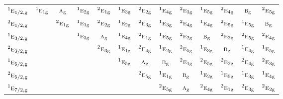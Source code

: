 \documentclass[10pt,a4paper]{article}
\numberwithin{equation}{section}
\newcommand{\irr}[1]{\text{\normalfont\scshape #1}}
\newcommand{\conjpair}[1]{{}^{#1}}
\newcommand{\ptag}[1]{\mathrm{#1}}
\begin{document}
{\begin{longtable}{@{}lcccccccccccc@{}}
$\conjpair{1}\irr{e}_{1/2,\ptag{g}}$ & $\conjpair{1}\irr{e}_{1\ptag{g}}$ & $\irr{a}_{\ptag{g}}$ & $\conjpair{1}\irr{e}_{2\ptag{g}}$ & $\conjpair{2}\irr{e}_{1\ptag{g}}$ & $\conjpair{1}\irr{e}_{3\ptag{g}}$ & $\conjpair{2}\irr{e}_{2\ptag{g}}$ & $\conjpair{1}\irr{e}_{4\ptag{g}}$ & $\conjpair{2}\irr{e}_{3\ptag{g}}$ & $\conjpair{1}\irr{e}_{5\ptag{g}}$ & $\conjpair{2}\irr{e}_{4\ptag{g}}$ & $\irr{b}_{\ptag{g}}$ & $\conjpair{2}\irr{e}_{5\ptag{g}}$\\
$\conjpair{2}\irr{e}_{1/2,\ptag{g}}$ &  & $\conjpair{2}\irr{e}_{1\ptag{g}}$ & $\conjpair{1}\irr{e}_{1\ptag{g}}$ & $\conjpair{2}\irr{e}_{2\ptag{g}}$ & $\conjpair{1}\irr{e}_{2\ptag{g}}$ & $\conjpair{2}\irr{e}_{3\ptag{g}}$ & $\conjpair{1}\irr{e}_{3\ptag{g}}$ & $\conjpair{2}\irr{e}_{4\ptag{g}}$ & $\conjpair{1}\irr{e}_{4\ptag{g}}$ & $\conjpair{2}\irr{e}_{5\ptag{g}}$ & $\conjpair{1}\irr{e}_{5\ptag{g}}$ & $\irr{b}_{\ptag{g}}$\\
$\conjpair{1}\irr{e}_{3/2,\ptag{g}}$ &  &  & $\conjpair{1}\irr{e}_{3\ptag{g}}$ & $\irr{a}_{\ptag{g}}$ & $\conjpair{1}\irr{e}_{4\ptag{g}}$ & $\conjpair{2}\irr{e}_{1\ptag{g}}$ & $\conjpair{1}\irr{e}_{5\ptag{g}}$ & $\conjpair{2}\irr{e}_{2\ptag{g}}$ & $\irr{b}_{\ptag{g}}$ & $\conjpair{2}\irr{e}_{3\ptag{g}}$ & $\conjpair{2}\irr{e}_{5\ptag{g}}$ & $\conjpair{2}\irr{e}_{4\ptag{g}}$\\
$\conjpair{2}\irr{e}_{3/2,\ptag{g}}$ &  &  &  & $\conjpair{2}\irr{e}_{3\ptag{g}}$ & $\conjpair{1}\irr{e}_{1\ptag{g}}$ & $\conjpair{2}\irr{e}_{4\ptag{g}}$ & $\conjpair{1}\irr{e}_{2\ptag{g}}$ & $\conjpair{2}\irr{e}_{5\ptag{g}}$ & $\conjpair{1}\irr{e}_{3\ptag{g}}$ & $\irr{b}_{\ptag{g}}$ & $\conjpair{1}\irr{e}_{4\ptag{g}}$ & $\conjpair{1}\irr{e}_{5\ptag{g}}$\\
$\conjpair{1}\irr{e}_{5/2,\ptag{g}}$ &  &  &  &  & $\conjpair{1}\irr{e}_{5\ptag{g}}$ & $\irr{a}_{\ptag{g}}$ & $\irr{b}_{\ptag{g}}$ & $\conjpair{2}\irr{e}_{1\ptag{g}}$ & $\conjpair{2}\irr{e}_{5\ptag{g}}$ & $\conjpair{2}\irr{e}_{2\ptag{g}}$ & $\conjpair{2}\irr{e}_{4\ptag{g}}$ & $\conjpair{2}\irr{e}_{3\ptag{g}}$\\
$\conjpair{2}\irr{e}_{5/2,\ptag{g}}$ &  &  &  &  &  & $\conjpair{2}\irr{e}_{5\ptag{g}}$ & $\conjpair{1}\irr{e}_{1\ptag{g}}$ & $\irr{b}_{\ptag{g}}$ & $\conjpair{1}\irr{e}_{2\ptag{g}}$ & $\conjpair{1}\irr{e}_{5\ptag{g}}$ & $\conjpair{1}\irr{e}_{3\ptag{g}}$ & $\conjpair{1}\irr{e}_{4\ptag{g}}$\\
$\conjpair{1}\irr{e}_{7/2,\ptag{g}}$ &  &  &  &  &  &  & $\conjpair{2}\irr{e}_{5\ptag{g}}$ & $\irr{a}_{\ptag{g}}$ & $\conjpair{2}\irr{e}_{4\ptag{g}}$ & $\conjpair{2}\irr{e}_{1\ptag{g}}$ & $\conjpair{2}\irr{e}_{3\ptag{g}}$ & $\conjpair{2}\irr{e}_{2\ptag{g}}$\\

\end{longtable}}
\end{document}
